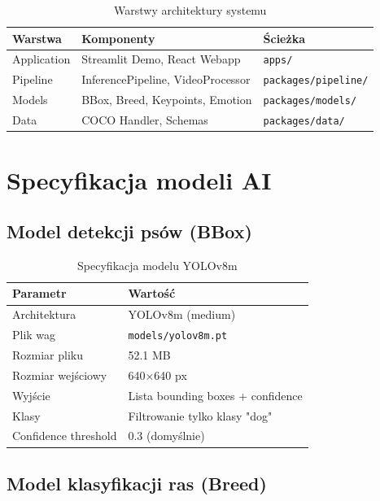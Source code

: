 \documentclass[12pt,a4paper]{article}
\begin{document}
\begin{table}[H]
\centering
\caption{Warstwy architektury systemu}
\begin{tabular}{|l|l|l|}
\hline
\textbf{Warstwa} & \textbf{Komponenty} & \textbf{Ścieżka} \\
\hline
Application & Streamlit Demo, React Webapp & \texttt{apps/} \\
\hline
Pipeline & InferencePipeline, VideoProcessor & \texttt{packages/pipeline/} \\
\hline
Models & BBox, Breed, Keypoints, Emotion & \texttt{packages/models/} \\
\hline
Data & COCO Handler, Schemas & \texttt{packages/data/} \\
\hline
\end{tabular}
\end{table}

\section{Specyfikacja modeli AI}

\subsection{Model detekcji psów (BBox)}

\begin{table}[H]
\centering
\caption{Specyfikacja modelu YOLOv8m}
\begin{tabular}{|l|l|}
\hline
\textbf{Parametr} & \textbf{Wartość} \\
\hline
Architektura & YOLOv8m (medium) \\
Plik wag & \texttt{models/yolov8m.pt} \\
Rozmiar pliku & 52.1 MB \\
Rozmiar wejściowy & 640×640 px \\
Wyjście & Lista bounding boxes + confidence \\
Klasy & Filtrowanie tylko klasy "dog" \\
Confidence threshold & 0.3 (domyślnie) \\
\hline
\end{tabular}
\end{table}

\subsection{Model klasyfikacji ras (Breed)}
\end{document}
